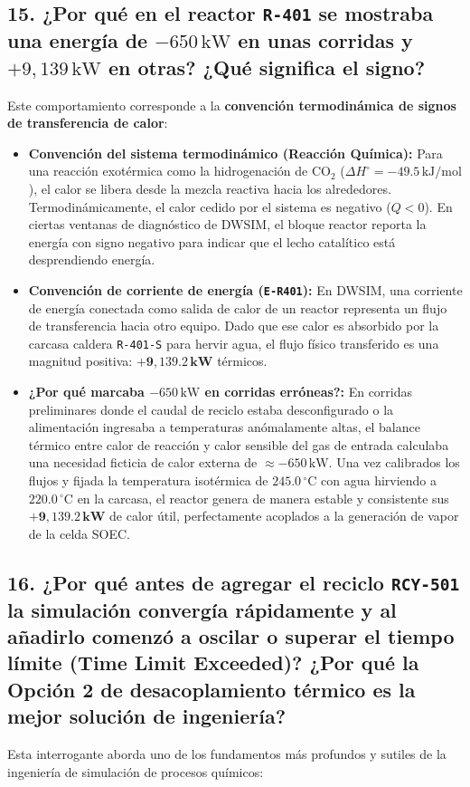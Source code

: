 \documentclass[11pt,a4paper]{article}
\begin{document}
\subsection{15. ¿Por qué en el reactor \texttt{R-401} se mostraba una energía de \texorpdfstring{$-650\,\text{kW}$}{-650 kW} en unas corridas y \texorpdfstring{$+9{,}139\,\text{kW}$}{+9,139 kW} en otras? ¿Qué significa el signo?}
Este comportamiento corresponde a la \textbf{convención termodinámica de signos de transferencia de calor}:
\begin{itemize}
    \item \textbf{Convención del sistema termodinámico (Reacción Química):}
    Para una reacción exotérmica como la hidrogenación de $\text{CO}_2$ ($\Delta H^\circ = -49.5\,\text{kJ/mol}$), el calor se libera desde la mezcla reactiva hacia los alrededores. Termodinámicamente, el calor cedido por el sistema es negativo ($Q < 0$). En ciertas ventanas de diagnóstico de DWSIM, el bloque reactor reporta la energía con signo negativo para indicar que el lecho catalítico está desprendiendo energía.
    \item \textbf{Convención de corriente de energía (\texttt{E-R401}):}
    En DWSIM, una corriente de energía conectada como salida de calor de un reactor representa un flujo de transferencia hacia otro equipo. Dado que ese calor es absorbido por la carcasa caldera \texttt{R-401-S} para hervir agua, el flujo físico transferido es una magnitud positiva: $\mathbf{+9{,}139.2\,\text{kW}}$ térmicos.
    \item \textbf{¿Por qué marcaba $-650\,\text{kW}$ en corridas erróneas?:} En corridas preliminares donde el caudal de reciclo estaba desconfigurado o la alimentación ingresaba a temperaturas anómalamente altas, el balance térmico entre calor de reacción y calor sensible del gas de entrada calculaba una necesidad ficticia de calor externa de $\approx -650\,\text{kW}$. Una vez calibrados los flujos y fijada la temperatura isotérmica de $245.0\,^\circ\text{C}$ con agua hirviendo a $220.0\,^\circ\text{C}$ en la carcasa, el reactor genera de manera estable y consistente sus $\mathbf{+9{,}139.2\,\text{kW}}$ de calor útil, perfectamente acoplados a la generación de vapor de la celda SOEC.
\end{itemize}

\subsection{16. ¿Por qué antes de agregar el reciclo \texttt{RCY-501} la simulación convergía rápidamente y al añadirlo comenzó a oscilar o superar el tiempo límite (Time Limit Exceeded)? ¿Por qué la Opción 2 de desacoplamiento térmico es la mejor solución de ingeniería?}
Esta interrogante aborda uno de los fundamentos más profundos y sutiles de la ingeniería de simulación de procesos químicos:
\end{document}
